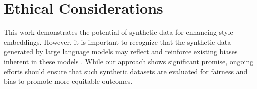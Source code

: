 \section * {Ethical Considerations}

This work demonstrates the potential of synthetic data for enhancing style embeddings. However, it is important to recognize that the synthetic data generated by large language models may reflect and reinforce existing biases inherent in these models \citep{lisa}. While our approach shows significant promise, ongoing efforts should ensure that such synthetic datasets are evaluated for fairness and bias to promote more equitable outcomes.